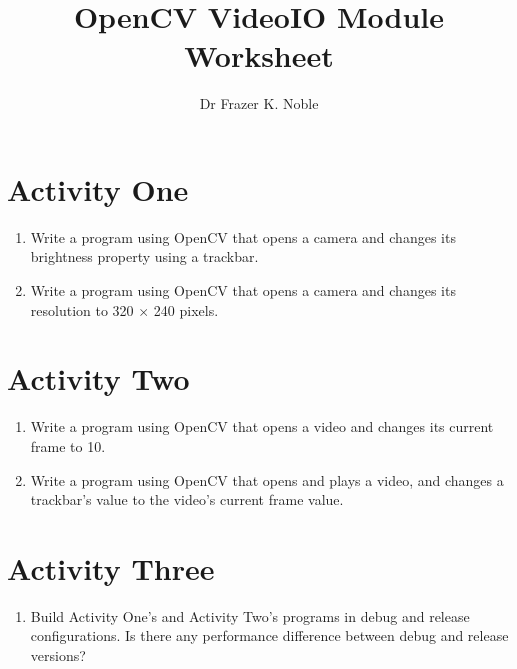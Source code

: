 \documentclass[12pt, A4]{article}
\title{OpenCV VideoIO Module Worksheet}
\author{Dr Frazer K. Noble}
\date{}
\begin{document}
\maketitle

\section*{Activity One}

\begin{enumerate}[label=(\alph*)]

    \item Write a program using OpenCV that opens a camera and changes its brightness property using a trackbar.

    \item Write a program using OpenCV that opens a camera and changes its resolution to 320 $\times$ 240 pixels.

\end{enumerate}

\section*{Activity Two}

\begin{enumerate}[label=(\alph*)]

    \item Write a program using OpenCV that opens a video and changes its current frame to 10.

    \item Write a program using OpenCV that opens and plays a video, and changes a trackbar's value to the video's current frame value.

\end{enumerate}

\section*{Activity Three}

\begin{enumerate}[label=(\alph*)]

   \item Build Activity One's and Activity Two's programs in debug and release configurations. Is there any performance difference between debug and release versions?

\end{enumerate}
\end{document}
